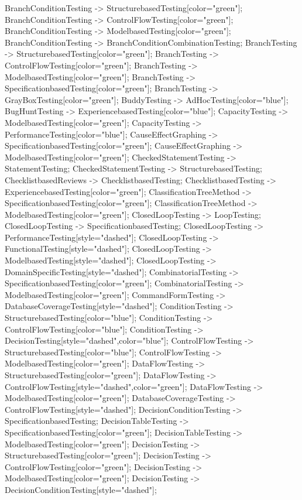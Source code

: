 \documentclass{article}
\begin{document}
{BranchConditionTesting -> StructurebasedTesting[color="green"];
BranchConditionTesting -> ControlFlowTesting[color="green"];
BranchConditionTesting -> ModelbasedTesting[color="green"];
BranchConditionTesting -> BranchConditionCombinationTesting;
BranchTesting -> StructurebasedTesting[color="green"];
BranchTesting -> ControlFlowTesting[color="green"];
BranchTesting -> ModelbasedTesting[color="green"];
BranchTesting -> SpecificationbasedTesting[color="green"];
BranchTesting -> GrayBoxTesting[color="green"];
BuddyTesting -> AdHocTesting[color="blue"];
BugHuntTesting -> ExperiencebasedTesting[color="blue"];
CapacityTesting -> ModelbasedTesting[color="green"];
CapacityTesting -> PerformanceTesting[color="blue"];
CauseEffectGraphing -> SpecificationbasedTesting[color="green"];
CauseEffectGraphing -> ModelbasedTesting[color="green"];
CheckedStatementTesting -> StatementTesting;
CheckedStatementTesting -> StructurebasedTesting;
ChecklistbasedReviews -> ChecklistbasedTesting;
ChecklistbasedTesting -> ExperiencebasedTesting[color="green"];
ClassificationTreeMethod -> SpecificationbasedTesting[color="green"];
ClassificationTreeMethod -> ModelbasedTesting[color="green"];
ClosedLoopTesting -> LoopTesting;
ClosedLoopTesting -> SpecificationbasedTesting;
ClosedLoopTesting -> PerformanceTesting[style="dashed"];
ClosedLoopTesting -> FunctionalTesting[style="dashed"];
ClosedLoopTesting -> ModelbasedTesting[style="dashed"];
ClosedLoopTesting -> DomainSpecificTesting[style="dashed"];
CombinatorialTesting -> SpecificationbasedTesting[color="green"];
CombinatorialTesting -> ModelbasedTesting[color="green"];
CommandFormTesting -> DatabaseCoverageTesting[style="dashed"];
ConditionTesting -> StructurebasedTesting[color="blue"];
ConditionTesting -> ControlFlowTesting[color="blue"];
ConditionTesting -> DecisionTesting[style="dashed",color="blue"];
ControlFlowTesting -> StructurebasedTesting[color="blue"];
ControlFlowTesting -> ModelbasedTesting[color="green"];
DataFlowTesting -> StructurebasedTesting[color="green"];
DataFlowTesting -> ControlFlowTesting[style="dashed",color="green"];
DataFlowTesting -> ModelbasedTesting[color="green"];
DatabaseCoverageTesting -> ControlFlowTesting[style="dashed"];
DecisionConditionTesting -> SpecificationbasedTesting;
DecisionTableTesting -> SpecificationbasedTesting[color="green"];
DecisionTableTesting -> ModelbasedTesting[color="green"];
DecisionTesting -> StructurebasedTesting[color="green"];
DecisionTesting -> ControlFlowTesting[color="green"];
DecisionTesting -> ModelbasedTesting[color="green"];
DecisionTesting -> DecisionConditionTesting[style="dashed"];
}
\end{document}
